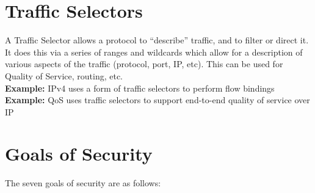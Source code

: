 \documentclass{article}
\begin{document}
\section{Traffic Selectors}
A Traffic Selector allows a protocol to ``describe'' traffic, and to filter or
direct it. It does this via a series of ranges and wildcards which allow for a
description of various aspects of the traffic (protocol, port, IP, etc). This
can be  used for Quality of Service, routing, etc. \\
\textbf{Example:} IPv4 uses a form of traffic selectors to perform flow
bindings \\
\textbf{Example:} QoS uses traffic selectors to support end-to-end quality of
service over IP \\

\section{Goals of Security}
The seven goals of security are as follows:
\end{document}
